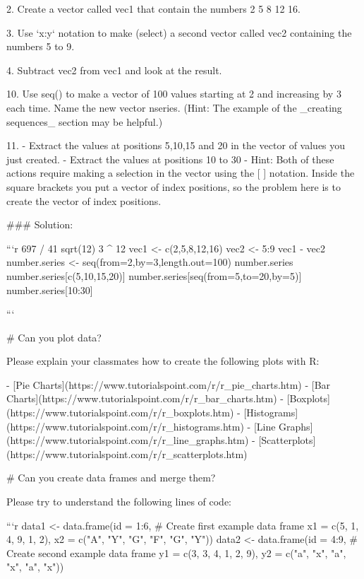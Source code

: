 {{2. Create a vector called vec1 that contain the numbers 2 5 8 12 16.

3. Use `x:y` notation to make (select) a second vector called vec2 containing the numbers 5 to 9.

4. Subtract vec2 from vec1 and look at the result.

10. Use seq() to make a vector of 100 values starting at 2 and increasing by 3 each time. Name the new vector nseries. (Hint: The example of the _creating sequences_ section may be helpful.)

11. 
  - Extract the values at positions 5,10,15 and 20 in the vector of values you just created.
  - Extract the values at positions 10 to 30
  - Hint: Both of these actions require making a selection in the vector using the [ ] notation. Inside the square brackets you put a vector of index positions, so the problem here is to create the vector of index positions.


### Solution:

```{r}
697 / 41
sqrt(12)
3 ^ 12
vec1 <- c(2,5,8,12,16) 
vec2 <- 5:9 
vec1 - vec2
number.series <- seq(from=2,by=3,length.out=100) 
number.series
number.series[c(5,10,15,20)]
number.series[seq(from=5,to=20,by=5)]
number.series[10:30]

```


# Can you plot data?

Please explain your classmates how to create the following plots with R:

- [Pie Charts](https://www.tutorialspoint.com/r/r_pie_charts.htm)
- [Bar Charts](https://www.tutorialspoint.com/r/r_bar_charts.htm)
- [Boxplots](https://www.tutorialspoint.com/r/r_boxplots.htm)
- [Histograms](https://www.tutorialspoint.com/r/r_histograms.htm)
- [Line Graphs](https://www.tutorialspoint.com/r/r_line_graphs.htm)
- [Scatterplots](https://www.tutorialspoint.com/r/r_scatterplots.htm)


# Can you create data frames and merge them?

Please try to understand the following lines of code:

```{r}
data1 <- data.frame(id = 1:6,                                  # Create first example data frame
                    x1 = c(5, 1, 4, 9, 1, 2),
                    x2 = c("A", "Y", "G", "F", "G", "Y"))
data2 <- data.frame(id = 4:9,                                  # Create second example data frame
                    y1 = c(3, 3, 4, 1, 2, 9),
                    y2 = c("a", "x", "a", "x", "a", "x"))

}}
